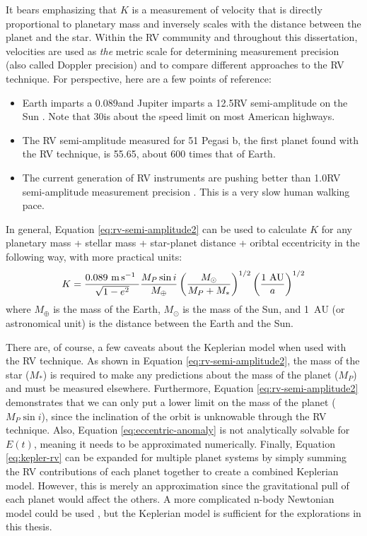 It bears emphasizing that $K$ is a measurement of velocity that is directly proportional to planetary mass and inversely scales with the distance between the planet and the star. Within the RV community and throughout this dissertation, velocities are used as \textit{the} metric scale for determining measurement precision (also called Doppler precision) and to compare different approaches to the RV technique. For perspective, here are a few points of reference:
\begin{itemize}
    \item Earth imparts a 0.089\ms and Jupiter imparts a 12.5\ms RV semi-amplitude on the Sun \citep{lovis_radial_2011}. Note that 30\ms is about the speed limit on most American highways.
    \item The RV semi-amplitude measured for 51 Pegasi b, the first planet found with the RV technique, is 55.65\ms \citep{mayor_jupiter-mass_1995}, about 600 times that of Earth.
    \item The current generation of RV instruments are pushing better than 1.0\ms RV semi-amplitude measurement precision \citep{fischer_state_2016}. This is a very slow human walking pace.
\end{itemize}
In general, Equation \ref{eq:rv-semi-amplitude2} can be used to calculate $K$ for any planetary mass + stellar mass + star-planet distance + oribtal eccentricity in the following way, with more practical units:
\begin{equation}
    K = \frac{0.089~\si{\meter\per\second}~}{\sqrt{1-e^2}} \frac{M_P \sin{i}}{M_\oplus} \left( \frac{M_\odot}{M_P+M_*} \right)^{1/2} \left(\frac{1~\mathrm{AU}}{a} \right)^{1/2}
\end{equation}
where $M_\oplus$ is the mass of the Earth, $M_\odot$ is the mass of the Sun, and 1~$\mathrm{AU}$ (or astronomical unit) is the distance between the Earth and the Sun.

There are, of course, a few caveats about the Keplerian model when used with the RV technique. As shown in Equation \ref{eq:rv-semi-amplitude2}, the mass of the star ($M_*$) is required to make any predictions about the mass of the planet ($M_P$) and must be measured elsewhere. Furthermore, Equation \ref{eq:rv-semi-amplitude2} demonstrates that we can only put a lower limit on the mass of the planet ($M_P\sin{i}$), since the inclination of the orbit is unknowable through the RV technique. Also, Equation \ref{eq:eccentric-anomaly} is not analytically solvable for $E(t)$, meaning it needs to be approximated numerically. Finally, Equation \ref{eq:kepler-rv} can be expanded for multiple planet systems by simply summing the RV contributions of each planet together to create a combined Keplerian model. However, this is merely an approximation since the gravitational pull of each planet would affect the others. A more complicated n-body Newtonian model could be used \citep[e.g.][]{rivera_75_2005, fischer_five_2008}, but the Keplerian model is sufficient for the explorations in this thesis.


